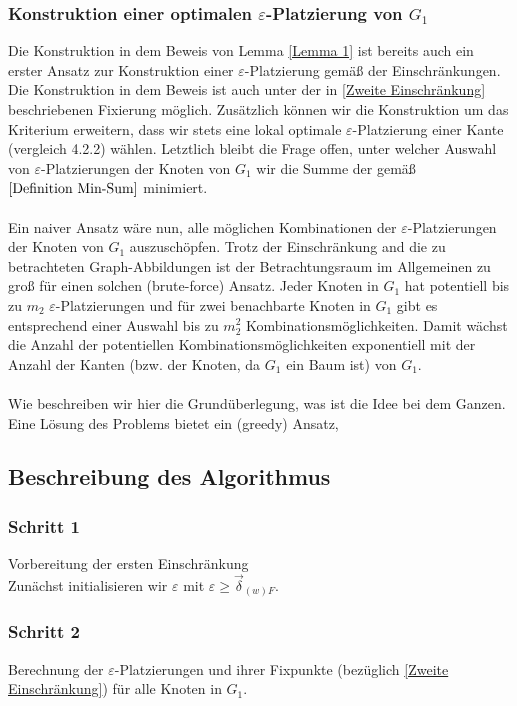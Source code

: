 \documentclass[a4paper, 12pt, twoside]{article}
\theoremstyle{Format1} %
\begin{document}
\subsubsection{Konstruktion einer optimalen $\varepsilon$-Platzierung von $G_1$}
Die Konstruktion in dem Beweis von Lemma \ref{Lemma 1} ist bereits auch ein erster Ansatz zur Konstruktion einer $\varepsilon$-Platzierung gemäß der Einschränkungen.
Die Konstruktion in dem Beweis ist auch unter der in \ref{Zweite Einschränkung} beschriebenen Fixierung
möglich. Zusätzlich können wir die Konstruktion um das Kriterium erweitern, dass wir stets eine lokal optimale $\varepsilon$-Platzierung einer Kante (vergleich 4.2.2) wählen.
Letztlich bleibt  die Frage offen, unter welcher Auswahl von $\varepsilon$-Platzierungen der Knoten von $G_1$ wir die Summe der gemäß $\ref{Definition Min-Sum}$
minimiert.
\\
\\
Ein naiver Ansatz wäre nun, alle möglichen Kombinationen der $\varepsilon$-Platzierungen der Knoten von $G_1$ auszuschöpfen.
Trotz der Einschränkung and die zu betrachteten Graph-Abbildungen ist der Betrachtungsraum im Allgemeinen zu groß
für einen solchen (brute-force) Ansatz. Jeder Knoten in $G_1$ hat potentiell bis zu $m_2$ $\varepsilon$-Platzierungen und für
zwei benachbarte Knoten in $G_1$ gibt es entsprechend einer Auswahl bis zu $m_2^2$ Kombinationsmöglichkeiten.
Damit wächst die Anzahl der potentiellen Kombinationsmöglichkeiten exponentiell mit der Anzahl der Kanten (bzw. der Knoten, da $G_1$ ein Baum ist) von $G_1$.
\\
\\
Wie beschreiben wir hier die Grundüberlegung, was ist die Idee bei dem Ganzen.
Eine Lösung des Problems bietet ein (greedy) Ansatz,
\subsection{Beschreibung des Algorithmus}

\subsubsection{Schritt 1}
Vorbereitung der ersten Einschränkung
\\
Zunächst initialisieren wir $\varepsilon$ mit $\varepsilon \geq \vec{\delta}_{(w)F}$.
\subsubsection{Schritt 2}
Berechnung der $\varepsilon$-Platzierungen und ihrer Fixpunkte (bezüglich \ref{Zweite Einschränkung}) für alle Knoten in $G_1$.
\end{document}
